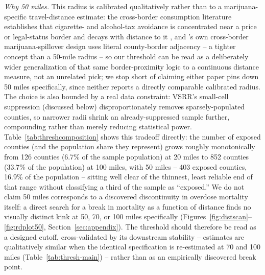 \documentclass[preprint,12pt,authoryear]{elsarticle}
\begin{document}
\emph{Why 50 miles.} This radius is calibrated qualitatively rather
than to a marijuana-specific travel-distance estimate: the
cross-border consumption literature establishes that cigarette- and
alcohol-tax avoidance is concentrated near a price or legal-status
border and decays with distance to it \citep{Lovenheim2008,
BeattyLarsenSommervoll2009}, and \citet{HaoCowan2020}'s own
cross-border marijuana-spillover design uses literal county-border
adjacency -- a tighter concept than a 50-mile radius -- so our
threshold can be read as a deliberately wider generalization of that
same border-proximity logic to a continuous distance measure, not an
unrelated pick; we stop short of claiming either paper pins down 50
miles specifically, since neither reports a directly comparable
calibrated radius. The choice is also bounded by a real data
constraint: VSRR's small-cell suppression (discussed below)
disproportionately removes sparsely-populated counties, so narrower
radii shrink an already-suppressed sample further, compounding rather
than merely reducing statistical power. Table~\ref{tab:threshcomposition}
shows this tradeoff directly: the number of exposed counties (and the
population share they represent) grows roughly monotonically from 126
counties (6.7\% of the sample population) at 20 miles to 852 counties
(33.7\% of the population) at 100 miles, with 50 miles -- 403 exposed
counties, 16.9\% of the population -- sitting well clear of the
thinnest, least reliable end of that range without classifying a third
of the sample as ``exposed.'' We do not claim 50 miles corresponds to
a discovered discontinuity in overdose mortality itself: a direct
search for a break in mortality as a function of distance finds no
visually distinct kink at 50, 70, or 100 miles specifically
(Figures~\ref{fig:distscan}--\ref{fig:rdplot50}, Section~\ref{sec:appendix}).
The threshold should therefore be read as a designed cutoff,
cross-validated by its downstream stability -- estimates are
qualitatively similar when the identical specification is re-estimated
at 70 and 100 miles (Table~\ref{tab:thresh-main}) -- rather than as an
empirically discovered break point.
\end{document}
